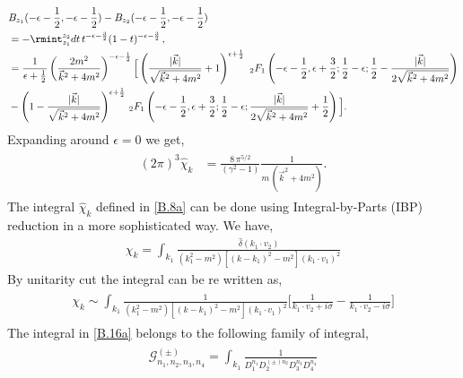 \begin{align}
\begin{split}
    & B_{z_1}(-\epsilon-\frac{1}{2} ,-\epsilon-\frac{1}{2} )-B_{z_2}(-\epsilon-\frac{1}{2} ,-\epsilon-\frac{1}{2} )\\ &=-\rmint_{z_1}^{z_2}dt \,t^{-\epsilon-\frac{3}{2}}(1-t)^{-\epsilon-\frac{3}{2}}\,,\\ &
      =\frac{1}{\epsilon +\frac{1}{2}}\left(\frac{2m^2}{\vec k^2+4m^2}\right)^{-\epsilon -\frac{1}{2}} \Big[\left(\frac{|\vec k|}{\sqrt{\vec k^2+4 m^2}}+1\right)^{\epsilon +\frac{1}{2}} \,\, _2F_1\left(-\epsilon -\frac{1}{2},\epsilon +\frac{3}{2};\frac{1}{2}-\epsilon ;\frac{1}{2}-\frac{|\vec k|}{2 \sqrt{ \vec k^2+4 m^2}}\right)\\ &-\left(1-\frac{|\vec k|}{\sqrt{\vec k^2+4 m^2}}\right)^{\epsilon +\frac{1}{2}} \, _2F_1\left(-\epsilon -\frac{1}{2},\epsilon +\frac{3}{2};\frac{1}{2}-\epsilon ;\frac{|\vec k|}{2 \sqrt{\vec k^2+4 m^2}}+\frac{1}{2}\right)\Big].
     \end{split}
     \end{align}
     Expanding around $\epsilon=0$ we get,
     \begin{align}
         \begin{split}
             (2\pi)^3\hat\chi_{k}&=\frac{8\,\pi^{5/2}}{(\gamma^2-1)}\frac{1}{m\,(\vec k^2+4m^2)}.\label{B.16ab}
         \end{split}
     \end{align}
     The integral $\hat\chi_k$ defined in \eqref{B.8a} can be done using Integral-by-Parts (IBP) reduction in a more sophisticated way. We have,
     \begin{align}
      \chi_k=   \int_{k_1}\frac{\hat\delta (k_1\cdot v_2)}{(k_1^2-m^2)[(k-k_1)^2-m^2](k_1\cdot v_1)^2}
     \end{align}
By unitarity cut the integral can be re written as,
\begin{align}
    \begin{split}
        \chi_k\sim \int_{k_1} \frac{1}{(k_1^2-m^2)[(k-k_1)^2-m^2](k_1\cdot v_1)^2}\Bigg[\frac{1}{k_1\cdot v_2+i\sigma}-\frac{1}{k_1\cdot v_2-i\sigma}\Bigg]\label{B.16a}
    \end{split}
    \end{align}
  The integral in \eqref{B.16a} belongs to the following family of integral,
  \begin{align}
      \begin{split}
          \mathcal{G}^{(\pm)}_{n_1,n_2,n_3,n_4}=\int_{k_1}\frac{1}{D_1^{n_1}D_2^{(\pm)n_2}D_3^{n_3}D_4^{n_4}}
      \end{split}
  \end{align}
